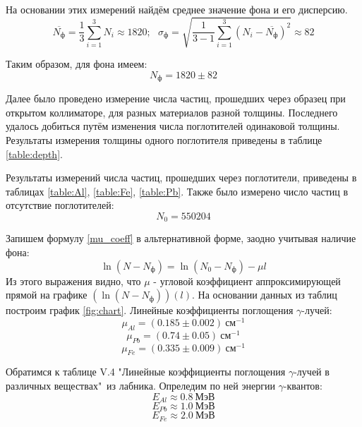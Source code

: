 \documentclass[12pt, a4paper, reqno]{article}
\begin{document}
    На основании этих измерений найдём среднее значение фона и его дисперсию.
    \begin{equation*}
        \overline{N_{\text{ф}}} = \frac{1}{3}\sum_{i = 1}^{3} N_i \approx 1820; \ \ \
        \sigma_{\text{ф}} = \sqrt{\frac{1}{3 - 1} \sum_{i = 1}^{3}(N_i - \overline{N_{\text{ф}}})^2}
        \approx 82
    \end{equation*}

    Таким образом, для фона имеем:
    \begin{equation*}
        \boxed{N_{\text{ф}} = 1820 \pm 82}
    \end{equation*}

    Далее было проведено измерение числа частиц, прошедших через образец при открытом коллиматоре,
    для разных материалов разной толщины. Последнего удалось добиться путём изменения числа
    поглотителей одинаковой толщины. Результаты измерения толщины одного поглотителя приведены в
    таблице \ref{table:depth}.

    Результаты измерений числа частиц, прошедших через поглотители, приведены в таблицах
    \ref{table:Al}, \ref{table:Fe}, \ref{table:Pb}. Также было измерено число частиц в отсутствие
    поглотителей:
    \begin{equation*}
        \boxed{N_0 = 550204}
    \end{equation*}

    Запишем формулу \eqref{mu_coeff} в альтернативной форме, заодно учитывая наличие фона:
    \begin{equation*}
        \ln{(N - N_{\text{ф}})} = \ln{(N_0 - N_{\text{ф}})} - \mu l
    \end{equation*}
    Из этого выражения видно, что $\mu$ - угловой коэффициент аппроксимирующей прямой на графике
    $(\ln(N - N_{\text{ф}}))(l)$. На основании данных из таблиц построим график \ref{fig:chart}.
    Линейные коэффициенты поглощения $\gamma$-лучей:
    \begin{equation*}
        \boxed{\mu_{Al} = (0.185 \pm 0.002)\ \text{см}^{-1}}
    \end{equation*}
    \begin{equation*}
        \boxed{\mu_{Pb} = (0.74 \pm 0.05)\ \text{см}^{-1}}
    \end{equation*}
    \begin{equation*}
        \boxed{\mu_{Fe} = (0.335 \pm 0.009)\ \text{см}^{-1}}
    \end{equation*}

    Обратимся к таблице V.4 "Линейные коэффициенты поглощения $\gamma$-лучей в различных веществах"\
    из лабника. Опреледим по ней энергии $\gamma$-квантов:
    \begin{equation*}
        \boxed{E_{Al} \approx 0.8\ \text{МэВ}}
    \end{equation*}
    \begin{equation*}
        \boxed{E_{Pb} \approx 1.0\ \text{МэВ}}
    \end{equation*}
    \begin{equation*}
        \boxed{E_{Fe} \approx 2.0\ \text{МэВ}}
    \end{equation*}
\end{document}
